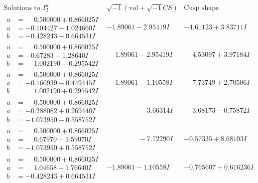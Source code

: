 \documentclass[1p]{elsarticle_modified}
\theoremstyle{definition}
\newcommand{\I}{\sqrt{-1}}
\begin{document}
$$\begin{array}{c|c|c}  
\text{Solutions to }I^u_{2}& \I (\text{vol} + \sqrt{-1}CS) & \text{Cusp shape}\\
 \hline 
\begin{aligned}
u &= \phantom{-}0.500000 + 0.866025 I \\
a &= -0.104427 - 1.024660 I \\
b &= -0.428243 - 0.664531 I\end{aligned}
 & -1.89061 - 2.95419 I & -4.61123 + 3.83711 I \\ \hline\begin{aligned}
u &= \phantom{-}0.500000 + 0.866025 I \\
a &= -0.67283 - 1.28640 I \\
b &= \phantom{-}1.002190 - 0.295542 I\end{aligned}
 & \phantom{-}1.89061 - 2.95419 I & \phantom{-}4.53097 + 3.97184 I \\ \hline\begin{aligned}
u &= \phantom{-}0.500000 + 0.866025 I \\
a &= -0.160939 - 0.449445 I \\
b &= \phantom{-}1.002190 + 0.295542 I\end{aligned}
 & \phantom{-}1.89061 - 1.10558 I & \phantom{-}7.73749 + 2.70506 I \\ \hline\begin{aligned}
u &= \phantom{-}0.500000 + 0.866025 I \\
a &= -0.288082 + 0.269440 I \\
b &= -1.073950 - 0.558752 I\end{aligned}
 & \phantom{-0.000000 -}3.66314 I & \phantom{-}3.68173 - 0.75872 I \\ \hline\begin{aligned}
u &= \phantom{-}0.500000 + 0.866025 I \\
a &= \phantom{-}0.67970 + 1.59070 I \\
b &= -1.073950 + 0.558752 I\end{aligned}
 & \phantom{-0.000000 } -7.72290 I & -0.57335 + 8.68103 I \\ \hline\begin{aligned}
u &= \phantom{-}0.500000 + 0.866025 I \\
a &= \phantom{-}1.04658 + 1.76640 I \\
b &= -0.428243 + 0.664531 I\end{aligned}
 & -1.89061 - 1.10558 I & -0.765607 + 0.616236 I \\ \hline\begin{aligned}

\end{aligned}
\end{array}$$
\end{document}
